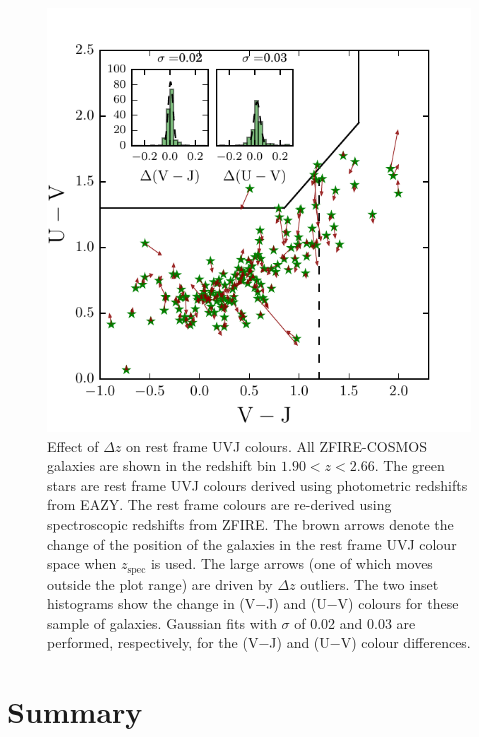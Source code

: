 \documentclass[iop]{emulateapj}
\begin{document}
\begin{figure}
\includegraphics[trim = 0 0 0 0, clip, scale=0.925]{figures/Rest_frame_UVJ_arrows.pdf}
\caption{ Effect of $\Delta z$ on rest frame UVJ colours. 
All ZFIRE-COSMOS galaxies are shown in the redshift bin $1.90<z<2.66$. 
The green stars are rest frame UVJ colours derived using photometric redshifts from EAZY. The rest frame colours are re-derived using spectroscopic redshifts from ZFIRE. The brown arrows denote the change of the position of the galaxies in the rest frame UVJ colour space when $z_{\mathrm{spec}}$ is used. The large arrows (one of which moves outside the plot range) are driven by $\Delta z$ outliers. 
The two inset histograms show the change in (V$-$J) and (U$-$V) colours for these sample of galaxies. Gaussian fits with $\sigma$ of 0.02 and 0.03 are performed, respectively, for the (V$-$J) and (U$-$V) colour differences.  
}
\label{fig:delta_UVJ}
\end{figure}









\section{Summary}
\label{sec:summary}
\end{document}
